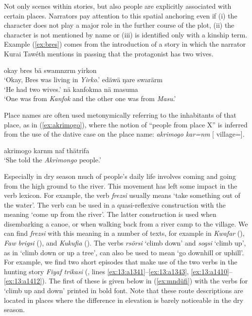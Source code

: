 Not only scenes within stories, but also people are explicitly associated with certain places. Narrators pay attention to this spatial anchoring even if (i) the character does not play a major role in the further course of the plot, (ii) the character is not mentioned by name or (iii) is identified only with a kinship term. Example (\ref{ex:bres}) comes from the introduction of a story in which the narrator Kurai Tawéth mentions in passing that the protagonist has two wives.

\ea\label{ex:bres}
    \ea
        okay bres bä swamnzrm yirkon\\
        \glt `Okay, Bres was living in \textit{Yirko}.'
    \ex
        edäwä ŋare swarärm\\
        \glt `He had two wives.'
    \ex
        nä kanfokma nä masuma\\        
        \glt `One was from \textit{Kanfok} and the other one was from \textit{Masu}.'
\z
\z

Place names are often used metonymically referring to the inhabitants of that place, as in (\ref{ex:akrimogo}), where the notion of ``people from place X'' is inferred from the use of the dative case on the place name: \textit{akrimogo kar=nm} [ village=].

\ea\label{ex:akrimogo}
    akrimogo karnm naf thätrifa\\
    \glt `She told the \textit{Akrimongo} people.'
\z

Especially in dry season much of people's daily life involves coming and going from the high ground to the river. This movement has left some impact in the verb lexicon. For example, the verb \emph{frezsi} usually means `take something out of the water'. The verb can be used in a quasi-reflexive construction with the meaning `come up from the river'. The latter construction is used when disembarking a canoe, or when walking back from a river camp to the village. We can find \textit{frezsi} with this meaning in a number of texts, for example in \textit{Kwafar} (), \textit{Faw brigsi} (), and \textit{Kukufia} (). The verbs \textit{rsörsi} ‘climb down’ and \textit{sogsi} ‘climb up’, as in ‘climb down or up a tree’, can also be used to mean `go downhill or uphill'. For example, we find two short episodes that make use of the two verbs in the hunting story \textit{Fiyaf trikasi} (, lines \ref{ex:13:a1341}--\ref{ex:13:a1343}, \ref{ex:13:a1410}--\ref{ex:13:a1412}). The first of these is given below in (\ref{ex:mndüfi}) with the verbs for `climb up and down' printed in bold font. Note that these route descriptions are located in places where the difference in elevation is barely noticeable in the dry season.

